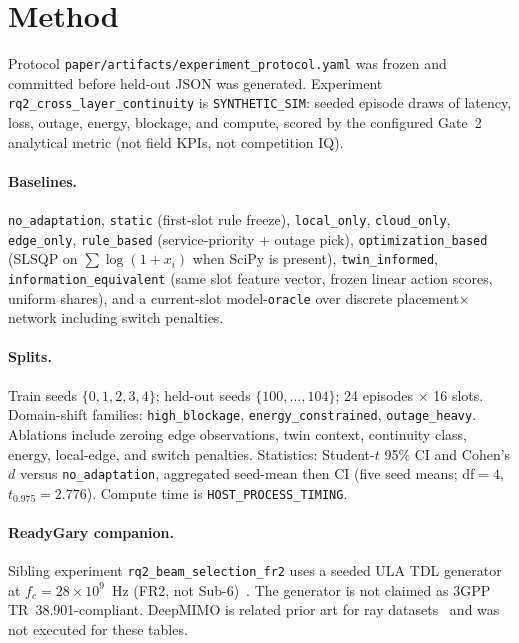 \section{Method}
Protocol \texttt{paper/artifacts/experiment\_protocol.yaml} was frozen and committed before held-out JSON was generated.
Experiment \texttt{rq2\_cross\_layer\_continuity} is \texttt{SYNTHETIC\_SIM}: seeded episode draws of latency, loss, outage, energy, blockage, and compute, scored by the configured Gate~2 analytical metric (not field KPIs, not competition IQ).

\paragraph{Baselines.}
\texttt{no\_adaptation}, \texttt{static} (first-slot rule freeze), \texttt{local\_only}, \texttt{cloud\_only}, \texttt{edge\_only}, \texttt{rule\_based} (service-priority + outage pick), \texttt{optimization\_based} (SLSQP on $\sum\log(1+x_i)$ when SciPy is present), \texttt{twin\_informed}, \texttt{information\_equivalent} (same slot feature vector, frozen linear action scores, uniform shares), and a current-slot model-\texttt{oracle} over discrete placement$\times$network including switch penalties.

\paragraph{Splits.}
Train seeds $\{0,1,2,3,4\}$; held-out seeds $\{100,\ldots,104\}$; 24 episodes $\times$ 16 slots.
Domain-shift families: \texttt{high\_blockage}, \texttt{energy\_constrained}, \texttt{outage\_heavy}.
Ablations include zeroing edge observations, twin context, continuity class, energy, local-edge, and switch penalties.
Statistics: Student-$t$ 95\% CI and Cohen's $d$ versus \texttt{no\_adaptation}, aggregated seed-mean then CI (five seed means; df$=4$, $t_{0.975}=2.776$).
Compute time is \texttt{HOST\_PROCESS\_TIMING}.

\paragraph{ReadyGary companion.}
Sibling experiment \texttt{rq2\_beam\_selection\_fr2} uses a seeded ULA TDL generator at $f_c=28\times10^9$~Hz (FR2, not Sub-6)~\cite{3gpp_ts38101_2}.
The generator is not claimed as 3GPP TR~38.901-compliant.
DeepMIMO is related prior art for ray datasets~\cite{alkhateeb2019deepmimo} and was not executed for these tables.
